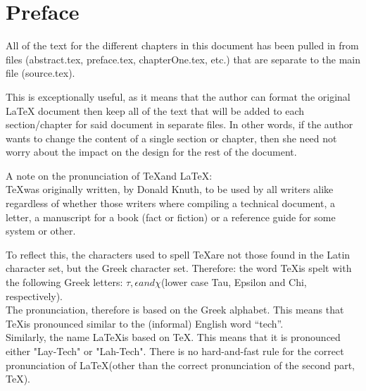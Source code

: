\chapter*{Preface}

All of the text for the different chapters in this document has been pulled in from files (abstract.tex, preface.tex, chapterOne.tex, etc.) that are separate to the main file (source.tex).
\par This is exceptionally useful, as it means that the author can format the original \LaTeX{} document then keep all of the text that will be added to each section/chapter for said document in separate files. In other words, if the author wants to change the content of a single section or chapter, then she need not worry about the impact on the design for the rest of the document.
\par A note on the pronunciation of \TeX and \LaTeX:\\
\indent{}\TeX was originally written, by Donald Knuth, to be used by all writers alike regardless of whether those writers where compiling a technical document, a letter, a manuscript for a book (fact or fiction) or a reference guide for some system or other.
\par To reflect this, the characters used to spell \TeX are not those found in the Latin character set, but the Greek character set. Therefore: the word \TeX is spelt with the following Greek letters:
\begin{math}
\tau, \epsilon and \chi
\end{math}(lower case Tau, Epsilon and Chi, respectively).\\
\indent{}The pronunciation, therefore is based on the Greek alphabet. This means that \TeX is pronounced similar to the (informal) English word ``tech''.\\
\indent{}Similarly, the name \LaTeX is based on \TeX. This means that it is pronounced either "Lay-Tech" or "Lah-Tech". There is no hard-and-fast rule for the correct  pronunciation of \LaTeX (other than the correct pronunciation of the second part, \TeX).




